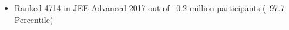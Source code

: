\documentclass[10pt]{article}
\begin{document}
\vspace{-3ex}
\spacedhrule{0.15ex}{1.0ex}
\begin{itemize}[leftmargin=*]
\item Ranked 4714 in JEE Advanced 2017 out of ~0.2 million participants (~97.7 Percentile) \href{https://github.com/vezcraz/Credentials/tree/master/Academic\%20Record/JEE} {\hspace{0.5ex}\faMousePointer} \\[-1.8em]

\end{itemize}
\end{document}
